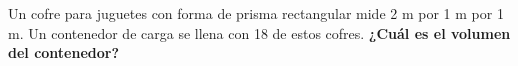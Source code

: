 Un cofre para juguetes con forma de prisma rectangular mide 2 m por 1 m por 1 m.
Un contenedor de carga se llena con 18 de estos cofres.
\textbf{¿Cuál es el volumen del contenedor?}\\


